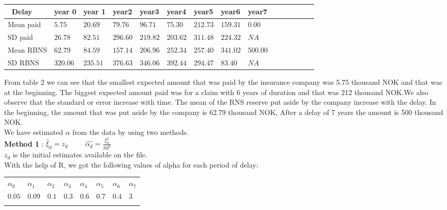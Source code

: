 \documentclass[a4paper]{article}
\begin{document}
\begin{tabular}{| p{2cm }|l| p{1cm}| l | p{1cm}| l | p{1cm}|l | p{1cm}|l | p{1cm} |l |p{1cm} |l |p{1cm}| }
\hline \noalign{\smallskip}
~Delay& year 0& year 1& year2& year3& year4& year5& year6& year7\\[.1cm]
\hline \noalign{\smallskip}
Mean paid  &$5.75$   &$20.69$  & $79.76$  & $96.71$  & $75.30$& $212.73$&$159.31$ &$ 0.00$\\[.2cm]
\hline \noalign{\smallskip}
SD paid &$26.78$&$82.51$&$ 296.60$& $ 219.82$ &$203.62 $& $ 311.48$ &$ 224.32 $&$NA$\\[.2cm]
\hline \noalign{\smallskip}
Mean RBNS & $62.79$ &$ 84.59 $& $157.14$& $ 206.96$&$252.34$&$257.40$&$341.02$&$500.00$\\[.2cm]
\hline \noalign{\smallskip}
SD RBNS &$320.06 $ &$235.51$&$376.63$&$346.06$&$392.44$&$294.47 $&$83.40 $&$NA$\\[.2cm]

\hline 

\end{tabular}



From table 2 we can see that the smallest expected amount that was paid by the insurance company was 5.75 thousand NOK and that was at the beginning. The biggest expected amount paid was for a claim with 6 years of duration and that was 212 thousand NOK.We also observe that the standard or error increase with time. The mean of the RNS reserve put aside by the company increase with the delay. 
In the beginning, the amount that was put aside by the company is 62.79 thousand NOK, After a delay of 7 years the amount is 500 thousand NOK. \\



We have estimated $\alpha$ from the data by using two methods.\\
\textbf{Method 1} :     $\hat\xi_d = z_d  ~~~~~~~~~~~    \hat{\alpha_d} = \frac{\xi^2_d}{Sd^2} $ \\
$ z_d $ is the initial estimates available on the file. \\
With the help of R, we got the following values of alpha for each period of delay:\\

\begin{tabular}{ p{1.5cm} p{1.5cm}  p{1.5cm}  p{1.5cm} p{1.5cm}  p{1.5cm} p{1.5cm} p{1.5cm} } \\
\hline \noalign{\smallskip}
$\alpha_0 $ &$\alpha_1 $ &$\alpha_2 $ &$\alpha_3 $& $\alpha_4 $& $\alpha_5 $& $\alpha_6 $& $\alpha_7$  \\ [.5cm]
$0.05 $ & $0.09$ & $ 0.1 $ & $0.3 $ & $0.6$ & $0.7 $ & $0.4 $ & $3$\\ [.1cm]
\hline   \\

\end{tabular} \\
\end{document}
